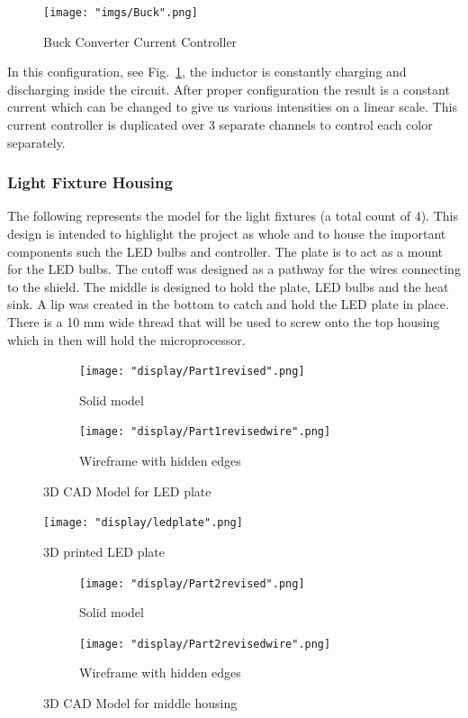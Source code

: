 \documentclass[12pt,a4paper]{report}
\begin{document}
\begin{figure}[H]
	\centering
	\texttt{[image: "imgs/Buck".png]}\par			
	\vspace{0.1cm}
	\caption{Buck Converter Current Controller}
	\label{fig:Buck}
\end{figure}

In this configuration, see Fig.~\ref{fig:Buck}, the inductor is constantly charging and discharging inside the circuit. After proper configuration the result is a constant current which can be changed to give us various intensities on a linear scale. This current controller is duplicated over 3 separate channels to control each color separately.

\subsubsection{Light Fixture Housing}
The following represents the model for the light fixtures (a total count of 4). This design is intended to highlight the project as whole and to house the important components such the LED bulbs and controller. The plate is to act as a mount for the LED bulbs. The cutoff was designed as a pathway for the wires connecting to the shield. The middle is designed to hold the plate, LED bulbs and the heat sink. A lip was created in the bottom to catch and hold the LED plate in place. There is a 10 mm wide thread that will be used to screw onto the top housing which in then will hold the microprocessor.
\begin{figure}[H]
\centering
\begin{subfigure}{.5\textwidth}
  \centering
  \texttt{[image: "display/Part1revised".png]}
  \caption{Solid model}
  \label{fig:sub1}
\end{subfigure}%
\begin{subfigure}{.5\textwidth}
  \centering
  \texttt{[image: "display/Part1revisedwire".png]}
  \caption{Wireframe with hidden edges}
  \label{fig:sub2}
\end{subfigure}
\caption{3D CAD Model for LED plate}
\label{fig:test}
\end{figure}
\begin{figure}[H]
	\centering
	\texttt{[image: "display/ledplate".png]}\par			
	\vspace{0.1cm}
	\caption{3D printed LED plate}
\end{figure}
\begin{figure}[H]
\centering
\begin{subfigure}{.5\textwidth}
  \centering
  \texttt{[image: "display/Part2revised".png]}
  \caption{Solid model}
  \label{fig:sub1}
\end{subfigure}%
\begin{subfigure}{.5\textwidth}
  \centering
  \texttt{[image: "display/Part2revisedwire".png]}
  \caption{Wireframe with hidden edges}
  \label{fig:sub2}
\end{subfigure}
\caption{3D CAD Model for middle housing}
\label{fig:test}
\end{figure}
\end{document}
